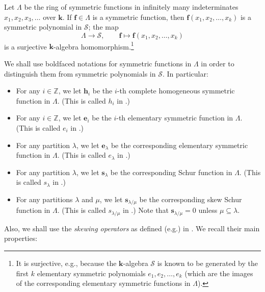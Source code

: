 \documentclass[numbers=enddot,12pt,final,onecolumn,notitlepage]{scrartcl}%
\theoremstyle{definition}
\begin{document}
Let $\Lambda$ be the ring of symmetric functions in infinitely many
indeterminates $x_{1},x_{2},x_{3},\ldots$ over $\mathbf{k}$. If $\mathbf{f}%
\in\Lambda$ is a symmetric function, then $\mathbf{f}\left(  x_{1}%
,x_{2},\ldots,x_{k}\right)  $ is a symmetric polynomial in $\mathcal{S}$; the
map%
\[
\Lambda\rightarrow\mathcal{S},\qquad\mathbf{f}\mapsto\mathbf{f}\left(
x_{1},x_{2},\ldots,x_{k}\right)
\]
is a surjective $\mathbf{k}$-algebra homomorphism.\footnote{It is surjective,
e.g., because the $\mathbf{k}$-algebra $\mathcal{S}$ is known to be generated
by the first $k$ elementary symmetric polynomials $e_{1},e_{2},\ldots,e_{k}$
(which are the images of the corresponding elementary symmetric functions in
$\Lambda$).}

We shall use boldfaced notations for symmetric functions in $\Lambda$ in order
to distinguish them from symmetric polynomials in $\mathcal{S}$. In particular:

\begin{itemize}
\item For any $i\in\mathbb{Z}$, we let $\mathbf{h}_{i}$ be the $i$-th complete
homogeneous symmetric function in $\Lambda$. (This is called $h_{i}$ in
\cite[Definition 2.2.1]{GriRei18}.)

\item For any $i\in\mathbb{Z}$, we let $\mathbf{e}_{i}$ be the $i$-th
elementary symmetric function in $\Lambda$. (This is called $e_{i}$ in
\cite[Definition 2.2.1]{GriRei18}.)

\item For any partition $\lambda$, we let $\mathbf{e}_{\lambda}$ be the
corresponding elementary symmetric function in $\Lambda$. (This is called
$e_{\lambda}$ in \cite[Definition 2.2.1]{GriRei18}.)

\item For any partition $\lambda$, we let $\mathbf{s}_{\lambda}$ be the
corresponding Schur function in $\Lambda$. (This is called $s_{\lambda}$ in
\cite[Definition 2.2.1]{GriRei18}.)

\item For any partitions $\lambda$ and $\mu$, we let $\mathbf{s}_{\lambda/\mu
}$ be the corresponding skew Schur function in $\Lambda$. (This is called
$s_{\lambda/\mu}$ in \cite[\S 2.3]{GriRei18}.) Note that $\mathbf{s}%
_{\lambda/\mu}=0$ unless $\mu\subseteq\lambda$.
\end{itemize}

Also, we shall use the \textit{skewing operators} as defined (e.g.) in
\cite[\S 2.8]{GriRei18}. We recall their main properties:
\end{document}
